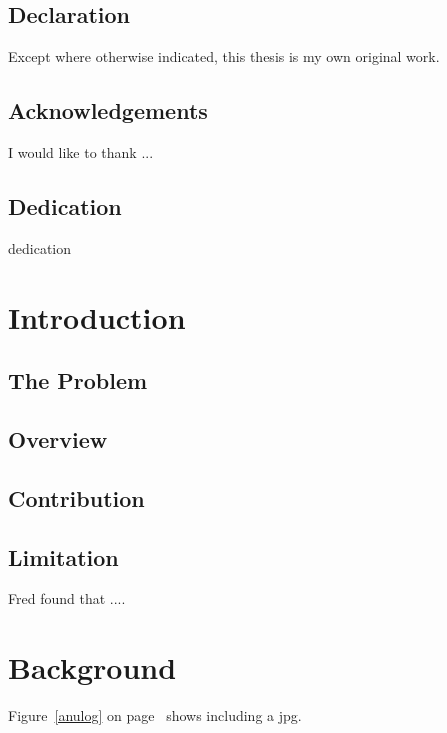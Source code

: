 \documentclass[pdftex,twoside,a4paper]{report}
\begin{document}
\begin{abstract}
\end{abstract}


\section*{Declaration}

Except where otherwise indicated, this thesis is my own original work.

\section*{Acknowledgements}

I would like to thank ...


\section*{Dedication}

\begin{center}
dedication 
\end{center}

\tableofcontents


\chapter{Introduction}

\section{The Problem}
\section{Overview}
\section{Contribution}
\section{Limitation}


Fred \cite{Fred10} found that .... 

\chapter{Background}

Figure~\ref{anulog} on page~\pageref{anulog} shows including a jpg.   
\end{document}
